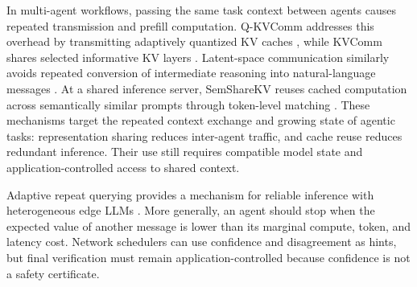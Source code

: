 \documentclass[letterpaper,journal]{IEEEtran}
\begin{document}
In multi-agent workflows, passing the same task context between agents causes
repeated transmission and prefill computation. Q-KVComm addresses this
overhead by transmitting adaptively quantized KV caches \cite{qkvcomm}, while
KVComm shares selected informative KV layers \cite{kvcomm}. Latent-space
communication similarly avoids repeated conversion of intermediate reasoning
into natural-language messages \cite{latentcomm}. At a shared inference
server, SemShareKV reuses cached computation across semantically similar
prompts through token-level matching \cite{semsharekv}. These mechanisms
target the repeated context exchange and growing state of agentic tasks:
representation sharing reduces inter-agent traffic, and cache reuse reduces
redundant inference. Their use still requires compatible model state and
application-controlled access to shared context.

Adaptive repeat querying provides a mechanism for reliable inference with
heterogeneous edge LLMs \cite{garq}. More generally,
an agent should stop when the expected value of another message is lower than
its marginal compute, token, and latency cost. Network schedulers can use
confidence and disagreement as hints, but final verification must remain
application-controlled because confidence is not a safety certificate.


\end{document}
